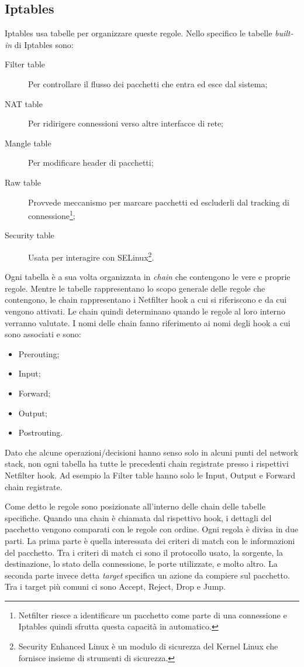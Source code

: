 \subsection{Iptables}
\label{iptables}
Iptables usa tabelle per organizzare queste regole. Nello specifico le tabelle \textit{built-in} di Iptables sono:
\begin{description}
    \item[Filter table] Per controllare il flusso dei pacchetti che entra ed esce dal sistema;
    \item[NAT table] Per ridirigere connessioni verso altre interfacce di rete;
    \item[Mangle table] Per modificare header di pacchetti;
    \item[Raw table] Provvede meccanismo per marcare pacchetti ed escluderli dal tracking di connessione\footnote{Netfilter  riesce a identificare un pacchetto come parte di una connessione e Iptables quindi sfrutta questa capacità in automatico.};
    \item[Security table] Usata per interagire con SELinux\footnote{Security Enhanced Linux è un modulo di sicurezza del Kernel Linux che fornisce insieme di strumenti di sicurezza.}.
\end{description}
Ogni tabella è a sua volta organizzata in \textit{chain} che contengono le vere e proprie regole. Mentre le tabelle rappresentano lo scopo generale delle regole che contengono, le chain rappresentano i Netfilter hook a cui si riferiscono e da cui vengono attivati. Le chain quindi determinano quando le regole al loro interno verranno valutate.
I nomi delle chain fanno riferimento ai nomi degli hook a cui sono associati e sono:
\begin{itemize}
    \item Prerouting;
    \item Input;
    \item Forward;
    \item Output;
    \item Postrouting.
\end{itemize}

Dato che alcune operazioni/decisioni hanno senso solo in alcuni punti del network stack, non ogni tabella ha tutte le precedenti chain registrate presso i rispettivi Netfilter hook. Ad esempio la Filter table hanno solo le Input, Output e Forward chain registrate.

Come detto le regole sono posizionate all'interno delle chain delle tabelle specifiche. Quando una chain è chiamata dal rispettivo hook, i dettagli del pacchetto vengono comparati con le regole con ordine. Ogni regola è divisa in due parti.
La prima parte è quella interessata dei criteri di match con le informazioni del pacchetto. Tra i criteri di match ci sono il protocollo usato, la sorgente, la destinazione, lo  stato della connessione, le porte utilizzate, e molto altro.
La seconda parte invece detta \textit{target} specifica un azione da compiere sul pacchetto. Tra i target più comuni ci sono Accept, Reject, Drop e Jump.

